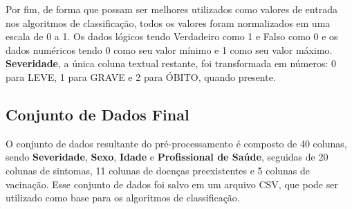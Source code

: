 Por fim, de forma que possam ser melhores utilizados como valores de entrada nos algoritmos de classificação, todos os valores foram normalizados em uma escala de 0 a 1. Os dados lógicos tendo Verdadeiro como 1 e Falso como 0 e os dados numéricos tendo 0 como seu valor mínimo e 1 como seu valor máximo. \textbf{Severidade}, a única coluna textual restante, foi transformada em números: 0 para LEVE, 1 para GRAVE e 2 para ÓBITO, quando presente.

\subsection{Conjunto de Dados Final}
\label{subsec:conjunto-dados-final}

O conjunto de dados resultante do pré-processamento é composto de 40 colunas, sendo \textbf{Severidade}, \textbf{Sexo}, \textbf{Idade} e \textbf{Profissional de Saúde}, seguidas de 20 colunas de sintomas, 11 colunas de doenças preexistentes e 5 colunas de vacinação.
Esse conjunto de dados foi salvo em um arquivo CSV, que pode ser utilizado como base para os algoritmos de classificação.